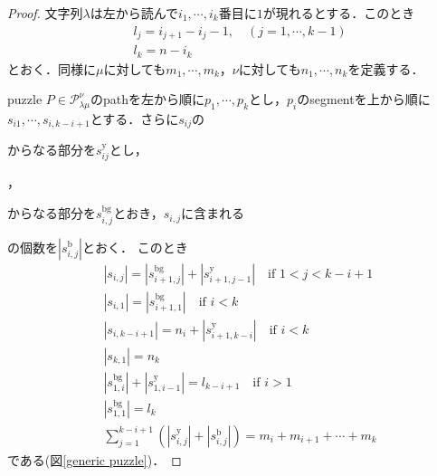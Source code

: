 \begin{proof}
  文字列$\lambda$は左から読んで$i_1,\cdots,i_k$番目に$1$が現れるとする．このとき
  \begin{align*}
    &l_j = i_{j+1} - i_{j} - 1,\quad (j=1,\cdots,k-1)\\
    &l_k = n - i_k
  \end{align*}
  とおく．同様に$\mu$に対しても$m_1,\cdots,m_{k}$，$\nu$に対しても$n_1,\cdots,n_{k}$を定義する．

  puzzle $P\in\mathcal{P}^\nu_{\lambda\mu}$のpathを左から順に$p_1,\cdots,p_k$とし，$p_i$のsegmentを上から順に$s_{i1},\cdots,s_{i,k-i+1}$とする．さらに$s_{ij}$の
  からなる部分を$s_{ij}^{\text{y}}$とし，
  ，
  からなる部分を$s_{i,j}^{\text{bg}}$とおき，$s_{i,j}$に含まれる
  の個数を$|s_{i,j}^{\text{b}}|$とおく．
  このとき
  \begin{align}
    &|s_{i,j}| = |s_{i+1,j}^{\text{bg}}| + |s_{i+1,j-1}^{\text{y}}| \quad \text{if } 1 < j < k-i+1\label{segment condition 1}\\
    &|s_{i,1}| = |s_{i+1,1}^{\text{bg}}|\label{segment condition 2}\quad \text{if } i < k\\
    &|s_{i,k-i+1}| = n_i + |s_{i+1, k-i}^{\text{y}}| \quad \text{if } i < k\label{segment condition 3}\\
    &|s_{k,1}| = n_k\label{segment condition 4}\\
    &|s_{1,i}^{\text{bg}}| + |s_{1,i-1}^{\text{y}}| = l_{k-i+1}\quad \text{if } i > 1\label{segment condition 5}\\
    &|s_{1,1}^{\text{bg}}| = l_{k}\label{segment condition 6}\\
    &\sum_{j=1}^{k-i+1}(|s_{i,j}^{\text{y}}|+|s_{i,j}^{\text{b}}|) = m_{i}+m_{i+1}+\cdots+m_{k}\label{segment condition 7}
  \end{align}
  である(図\ref{generic puzzle})．


\end{proof}
